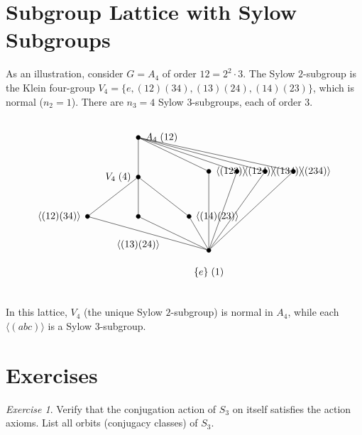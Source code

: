 \documentclass[12pt,a4paper,openany]{book}
\theoremstyle{definition}
\theoremstyle{remark}
\newtheorem{exercise}{Exercise}[chapter]
\begin{document}
\section{Subgroup Lattice with Sylow Subgroups}\label{sec:sylow-lattice}

As an illustration, consider $G=A_4$ of order $12=2^2\cdot 3$.
The Sylow $2$-subgroup is the Klein four-group $V_4=\{e,(12)(34),(13)(24),(14)(23)\}$,
which is normal ($n_2=1$).  There are $n_3=4$ Sylow $3$-subgroups,
each of order $3$.

\[
\begin{tikzpicture}[
   every node/.style={draw,circle,inner sep=1.5pt,fill=black},
   label distance=2pt,
   level distance=1.4cm,
   sibling distance=1.8cm
]
   \node[label=right:{$A_4\;(12)$}] (G) at (0,4) {}
      child {node[label=left:{$V_4\;(4)$}] (V) {}
         child {node[label=left:{$\langle(12)(34)\rangle$}] (a) {}}
         child {node[label=below:{$\langle(13)(24)\rangle$}] (b) {}}
         child {node[label=right:{$\langle(14)(23)\rangle$}] (c) {}}
      };
   \node[label=right:{$\langle(123)\rangle$}] (P1) at (2.5,2.8) {};
   \node[label=right:{$\langle(124)\rangle$}] (P2) at (3.5,2.8) {};
   \node[label=right:{$\langle(134)\rangle$}] (P3) at (4.5,2.8) {};
   \node[label=right:{$\langle(234)\rangle$}] (P4) at (5.5,2.8) {};

   \node[label=below:{$\{e\}\;(1)$}] (E) at (2.5,0) {};

   \draw (G) -- (P1); \draw (G) -- (P2);
   \draw (G) -- (P3); \draw (G) -- (P4);
   \draw (P1) -- (E); \draw (P2) -- (E);
   \draw (P3) -- (E); \draw (P4) -- (E);
   \draw (a) -- (E); \draw (b) -- (E); \draw (c) -- (E);
\end{tikzpicture}
\]

\noindent
In this lattice, $V_4$ (the unique Sylow $2$-subgroup) is normal in
$A_4$, while each $\langle(abc)\rangle$ is a Sylow $3$-subgroup.

\section{Exercises}\label{sec:ch4-exercises}

\begin{exercise}\label{exo:action-verify}
Verify that the conjugation action of $S_3$ on itself satisfies the
action axioms.  List all orbits (conjugacy classes) of $S_3$.
\end{exercise}
\end{document}
